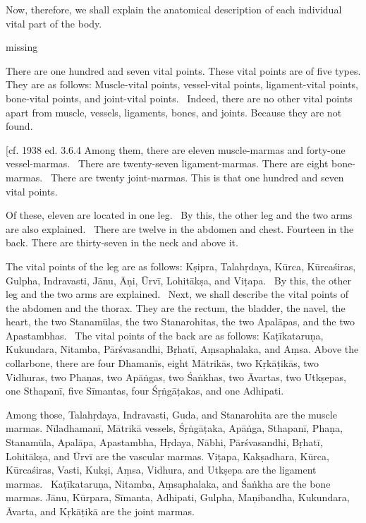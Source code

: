 \begin{translation}

  
\bigskip       

 \begin{tt}
    \raggedright
    \bigskip

           

\item[1]
Now, therefore, we shall explain the anatomical description of each individual vital part of the body. 

\item[2] missing
\item[3]
There are one hundred and seven vital points.
These vital points are of five types.
They are as follows:
Muscle-vital points, vessel-vital points, ligament-vital points, bone-vital points, and joint-vital points.  Indeed, there are no other vital points apart from muscle, vessels, ligaments, bones, and joints. Because they are not found. 

[cf. 1938 ed. 3.6.4
Among them, there are eleven muscle-marmas and forty-one vessel-marmas. 
There are twenty-seven ligament-marmas.
There are eight bone-marmas. 
There are twenty joint-marmas.
This is that one hundred and seven vital points.

\item[5]
Of these, eleven are located in one leg. 
By this, the other leg and the two arms are also explained. 
There are twelve in the abdomen and chest.
Fourteen in the back.
There are thirty-seven in the neck and above it.

\item[6]
The vital points of the leg are as follows: Kṣipra, Talahṛdaya, Kūrca, Kūrcaśiras, Gulpha, Indravasti, Jānu, Āṇi, Ūrvī, Lohitākṣa, and Viṭapa.  By this, the other leg and the two arms are explained.  Next, we shall describe the vital points of the abdomen and the thorax. They are the rectum, the bladder, the navel, the heart, the two Stanamūlas, the two Stanarohitas, the two Apalāpas, and the two Apastambhas.  The vital points of the back are as follows: Kaṭīkataruṇa, Kukundara, Nitamba, Pārśvasandhi, Bṛhatī, Aṃsaphalaka, and Aṃsa. Above the collarbone, there are four Dhamanīs, eight Mātrikās, two Kṛkāṭikās, two Vidhuras, two Phaṇas, two Apāṅgas, two Śaṅkhas, two Āvartas, two Utkṣepas, one Sthapanī, five Sīmantas, four Śṛṅgāṭakas, and one Adhipati.

\item[7]
Among those, Talahṛdaya, Indravasti, Guda, and Stanarohita are the muscle marmas.
Nīladhamanī, Mātrikā vessels, Śṛṅgāṭaka, Apāṅga, Sthapanī, Phaṇa, Stanamūla, Apalāpa, Apastambha, Hṛdaya, Nābhi, Pārśvasandhi, Bṛhatī, Lohitākṣa, and Ūrvī are the vascular marmas.
Viṭapa, Kakṣadhara, Kūrca, Kūrcaśiras, Vasti, Kukṣi, Aṃsa, Vidhura, and Utkṣepa are the ligament marmas. 
Kaṭīkataruṇa, Nitamba, Aṃsaphalaka, and Śaṅkha are the bone marmas.
Jānu, Kūrpara, Sīmanta, Adhipati, Gulpha, Maṇibandha, Kukundara, Āvarta, and Kṛkāṭikā are the joint marmas.


\end{tt}
\end{translation}
